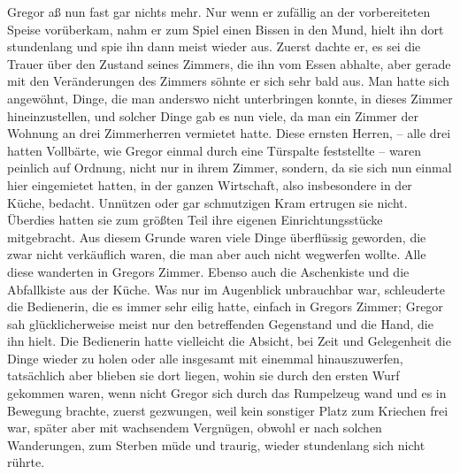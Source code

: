 Gregor aß nun fast gar nichts mehr. Nur wenn er zufällig an der
vorbereiteten Speise vorüberkam, nahm er zum Spiel einen Bissen in den
Mund, hielt ihn dort stundenlang und spie ihn dann meist wieder aus.
Zuerst dachte er, es sei die Trauer über den Zustand seines Zimmers, die
ihn vom Essen abhalte, aber gerade mit den Veränderungen des Zimmers
söhnte er sich sehr bald aus. Man hatte sich angewöhnt, Dinge, die man
anderswo nicht unterbringen konnte, in dieses Zimmer hineinzustellen,
und solcher Dinge gab es nun viele, da man ein Zimmer der Wohnung an
drei Zimmerherren vermietet hatte. Diese ernsten Herren, -- alle drei
hatten Vollbärte, wie Gregor einmal durch eine Türspalte feststellte --
waren peinlich auf Ordnung, nicht nur in ihrem Zimmer, sondern, da sie
sich nun einmal hier eingemietet hatten, in der ganzen Wirtschaft, also
insbesondere in der Küche, bedacht. Unnützen oder gar schmutzigen Kram
ertrugen sie nicht. Überdies hatten sie zum größten Teil ihre eigenen
Einrichtungsstücke mitgebracht. Aus diesem Grunde waren viele Dinge
überflüssig geworden, die zwar nicht verkäuflich waren, die man aber
auch nicht wegwerfen wollte. Alle diese wanderten in Gregors Zimmer.
Ebenso auch die Aschenkiste und die Abfallkiste aus der Küche. Was nur
im Augenblick unbrauchbar war, schleuderte die Bedienerin, die es immer
sehr eilig hatte, einfach in Gregors Zimmer; Gregor sah glücklicherweise
meist nur den betreffenden Gegenstand und die Hand, die ihn hielt. Die
Bedienerin hatte vielleicht die Absicht, bei Zeit und Gelegenheit die
Dinge wieder zu holen oder alle insgesamt mit einemmal hinauszuwerfen,
tatsächlich aber blieben sie dort liegen, wohin sie durch den ersten
Wurf gekommen waren, wenn nicht Gregor sich durch das Rumpelzeug wand
und es in Bewegung brachte, zuerst gezwungen, weil kein sonstiger Platz
zum Kriechen frei war, später aber mit wachsendem Vergnügen, obwohl er
nach solchen Wanderungen, zum Sterben müde und traurig, wieder
stundenlang sich nicht rührte.

